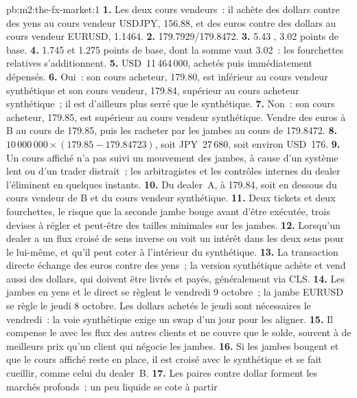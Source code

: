\begin{solution}{pb:m2:the-fx-market:1}
\textbf{1.} Les deux cours vendeurs~: il achète des dollars contre des yens au cours vendeur USDJPY, 156.88, et
des euros contre des dollars au cours vendeur EURUSD, 1.1464.
\textbf{2.} 179.7929/179.8472.
\textbf{3.} 5.43 , 3.02 points de base.
\textbf{4.} 1.745 et 1.275 points de base, dont la somme vaut 3.02~: les fourchettes relatives s'additionnent.
\textbf{5.} USD~11\,464\,000, achetés puis immédiatement dépensés.
\textbf{6.} Oui~: son cours acheteur, 179.80, est inférieur au cours vendeur synthétique et son cours vendeur, 179.84,
supérieur au cours acheteur synthétique~; il est d'ailleurs plus serré que le synthétique.
\textbf{7.} Non~: son cours acheteur, 179.85, est supérieur au cours vendeur synthétique. Vendre des euros à B au
cours de 179.85, puis les racheter par les jambes au cours de 179.8472.
\textbf{8.} $10\,000\,000 \times (179.85 - 179.84723)$, soit JPY~27\,680, soit environ USD~176.
\textbf{9.} Un cours affiché n'a pas suivi un mouvement des jambes, à cause d'un système lent ou
d'un trader distrait~; les arbitragistes et les contrôles internes du dealer l'éliminent en
quelques instants.
\textbf{10.} Du dealer~A, à 179.84, soit en dessous du cours vendeur de B et du cours vendeur synthétique.
\textbf{11.} Deux tickets et deux fourchettes, le risque que la seconde jambe bouge
avant d'être exécutée, trois devises à régler et peut-être des tailles minimales sur les
jambes.
\textbf{12.} Lorsqu'un dealer a un flux croisé de sens inverse ou voit un intérêt dans les deux sens
pour le  lui-même, et qu'il peut coter à l'intérieur du synthétique.
\textbf{13.} La transaction directe échange des euros contre des yens~; la version synthétique achète et vend aussi
des dollars, qui doivent être livrés et payés, généralement via CLS.
\textbf{14.} Les jambes en yens et le  direct se règlent le vendredi 9 octobre~; la
jambe EURUSD se règle le jeudi 8 octobre. Les dollars achetés le jeudi sont nécessaires le
vendredi~: la voie synthétique exige un swap d'un jour pour les aligner.
\textbf{15.} Il compense le  avec les flux des autres clients et ne couvre que le
solde, souvent à de meilleurs prix qu'un client qui négocie les jambes.
\textbf{16.} Si les jambes bougent et que le cours affiché reste en place, il est croisé avec le
synthétique et se fait cueillir, comme celui du dealer~B.
\textbf{17.} Les paires contre dollar forment les marchés profonds~; un  peu liquide se cote à partir

\end{solution}

